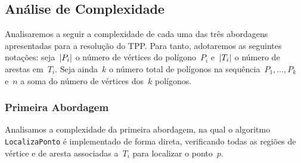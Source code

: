 \documentclass[11pt]{article}
\DeclarePairedDelimiter{\abs}{\lvert}{\rvert}
\begin{document}
\subsection{Análise de Complexidade}

Analisaremos a seguir a complexidade de cada uma das três abordagens apresentadas para a resolução do TPP. Para tanto, adotaremos as seguintes notações: seja~\(\abs{P_i}\) o número de vértices do polígono~\(P_i\) e~\(\abs{T_i}\) o número de arestas em~\(T_i\). Seja ainda~\(k\) o número total de polígonos na sequência~\(P_1, \dots, P_k\) e~\(n\) a soma do número de vértices dos~\(k\) polígonos.

\subsubsection{Primeira Abordagem}

Analisamos a complexidade da primeira abordagem, na qual o algoritmo \texttt{LocalizaPonto} é implementado de forma direta, verificando todas as regiões de vértice e de aresta associadas a~\(T_i\) para localizar o ponto~\(p\).
\end{document}
